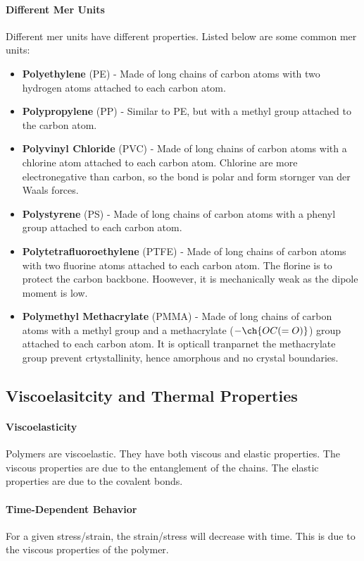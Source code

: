 \documentclass[11pt]{article}
\begin{document}
\paragraph{Different Mer Units} Different mer units have different properties. Listed below are some common mer units:
\begin{itemize}
    \item \textbf{Polyethylene} (PE) - Made of long chains of carbon atoms with two hydrogen atoms attached to each carbon atom.
    \item \textbf{Polypropylene} (PP) - Similar to PE, but with a methyl group attached to the carbon atom.
    \item \textbf{Polyvinyl Chloride} (PVC) - Made of long chains of carbon atoms with a chlorine atom attached to each carbon atom. Chlorine are more electronegative than carbon, so the bond is polar and form stornger van der Waals forces.
    \item \textbf{Polystyrene} (PS) - Made of long chains of carbon atoms with a phenyl group attached to each carbon atom.
    \item \textbf{Polytetrafluoroethylene} (PTFE) - Made of long chains of carbon atoms with two fluorine atoms attached to each carbon atom. The florine is to protect the carbon backbone. Hoowever, it is mechanically weak as the dipole moment is low.
    \item \textbf{Polymethyl Methacrylate} (PMMA) - Made of long chains of carbon atoms with a methyl group and a methacrylate ($-\ch{OC(=O)}$) group attached to each carbon atom. It is opticall tranparnet the methacrylate group prevent crtystallinity, hence amorphous and no crystal boundaries.
\end{itemize}
\subsection{Viscoelasitcity and Thermal Properties}
\paragraph{Viscoelasticity} Polymers are viscoelastic. They have both viscous and elastic properties. The viscous properties are due to the entanglement of the chains. The elastic properties are due to the covalent bonds.
\paragraph{Time-Dependent Behavior} For a given stress/strain, the strain/stress will decrease with time. This is due to the viscous properties of the polymer.
\end{document}
